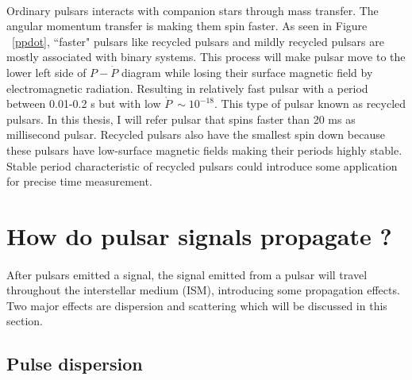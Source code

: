 \documentclass[thesis_msc.tex]{subfiles}
\begin{document}
\paragraph{} Ordinary pulsars interacts with companion stars through mass transfer.  The angular momentum transfer is making them spin faster. As seen in Figure ~\ref{ppdot}, ``faster" pulsars like recycled pulsars and mildly recycled pulsars are mostly associated with binary systems. This process will make pulsar move to the lower left side of $P-\dot{P}$ diagram while losing their surface magnetic field by electromagnetic radiation. Resulting in relatively fast pulsar with a period between 0.01-0.2 s but with low $\dot{P} ~\sim 10^{-18}$. This type of pulsar known as recycled pulsars. In this thesis, I will refer pulsar that spins faster than 20 ms as millisecond pulsar. Recycled pulsars also have the smallest spin down because these pulsars have low-surface magnetic fields making their periods highly stable. Stable period characteristic of recycled pulsars could introduce some application for precise time measurement.  

 \section{How do pulsar signals propagate ?}
 \paragraph{} After pulsars emitted a signal, the signal emitted from a pulsar will travel throughout the interstellar medium (ISM), introducing some propagation effects. Two major effects are dispersion and scattering which will be discussed in this section.   
    \subsection{Pulse dispersion} \label{Pulse_dispersion}
\end{document}
